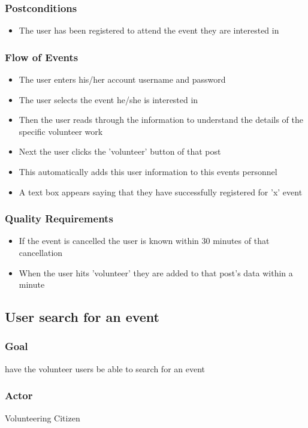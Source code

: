 \documentclass[12pt]{article}
\begin{document}
\subsubsection{Postconditions}
\begin{itemize}
\item
	The user has been registered to attend the event they are interested in
\end{itemize}
\subsubsection{Flow of Events}
\begin{itemize}
\item
	The user enters his/her account username and password
\item
	The user selects the event he/she is interested in
\item
	Then the user reads through the information to understand the details of the
	specific volunteer work
\item
	Next the user clicks the 'volunteer' button of that post
\item
	This automatically adds this user information to this events personnel
\item
	A text box appears saying that they have successfully registered for 'x' event
\end{itemize}
\subsubsection{Quality Requirements}
\begin{itemize}
\item
	If the event is cancelled the user is known within 30 minutes of that cancellation
\item
	When the user hits 'volunteer' they are added to that post's data within a minute
\end{itemize}
\subsection{User search for an event}
\subsubsection{Goal}
have the volunteer users be able to search for an event
\subsubsection{Actor}
Volunteering Citizen
\end{document}
